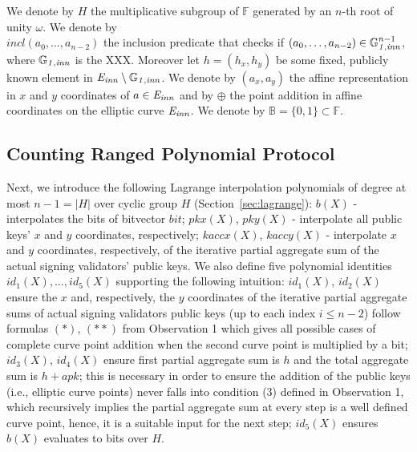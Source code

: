 \vspace{-0.009in}
\noindent We denote by $H$ the multiplicative subgroup of $\mathbb{F}$ generated 
by an $n$-th root of unity $\omega$. We denote by \\ $\mathit{incl}(a_0, \ldots, a_{n-2})$ the inclusion 
predicate that checks if $(a_0, \ldots, a_{n-2}) \in \mathbb{G}_{\mathit{1,inn}}^{n-1}$, where $\mathbb{G}_{\mathit{1,inn}}$ is the XXX. 
Moreover let $h = (\mathit{h_x}, \mathit{h_y})$ be some fixed, publicly known element in $\mathit{E}_{\mathit{inn}} \setminus \mathbb{G}_{\mathit{1,inn}}$. 
We denote by $(a_x, a_y)$ the affine representation in $x$ and $y$ coordinates of $a \in \mathit{E}_{\mathit{inn}}$ and by $\oplus$ 
the point addition in affine coordinates on the elliptic curve $\mathit{E}_{\mathit{inn}}$. We denote by $\mathbb{B} = \{0,1\} \subset \mathbb{F}$. \\
\vspace{-0.15in}

\subsection{Counting Ranged Polynomial Protocol}
\label{sec_vt}

\noindent Next, we introduce the following Lagrange interpolation polynomials of degree at most $n-1 = |H|$ over cyclic group $H$ (Section~\ref{sec:lagrange}): 
$b(X)$ - interpolates the bits of bitvector $\mathit{bit}$; $pkx(X)$, $pky(X)$ - interpolate all public keys' 
$x$ and $y$ coordinates, respectively; $kaccx(X)$, $kaccy(X)$ - interpolate $x$ and $y$ coordinates, respectively, 
of the iterative partial aggregate sum of the actual signing validators' public keys. We also define five polynomial identities $id_1(X), \ldots, id_5(X)$ supporting the following intuition: $id_1(X)$, $id_2(X)$ 
ensure the $x$ and, respectively, the $y$ coordinates of the iterative partial aggregate sums of actual signing validators public keys 
(up to each index $i \leq n-2$) follow formulas $(\ast)$, $(\ast\ast)$ from Observation 1 which gives all possible cases of 
complete curve point addition when the second curve point is multiplied by a bit; $id_3(X)$, $id_4(X)$ 
ensure first partial aggregate sum is $h$ and the total aggregate sum is $h + \mathit{apk}$; this is necessary in order to ensure the 
addition of the public keys (i.e., elliptic curve points) never falls into condition (3) defined in Observation 1, which recursively implies the 
partial aggregate sum at every step is a well defined curve point, hence, it is a suitable input for the next step; 
$id_5(X)$ ensures $b(X)$ evaluates to bits over $H$. \\

